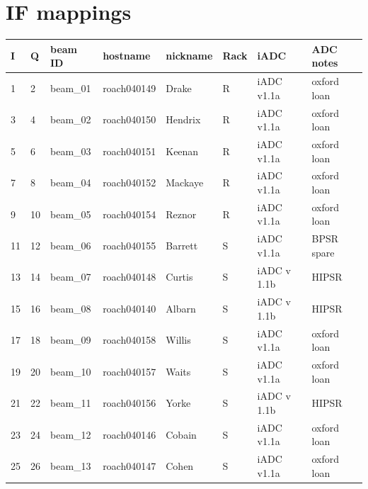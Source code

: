 \documentclass[letterpaper,10pt,english]{sphinxmanual}
\begin{document}
\section{IF mappings}
\label{ip_allocation:if-mappings}
\begin{tabulary}{\linewidth}{|L|L|L|L|L|L|L|L|}
\hline
\textbf{
I
} & \textbf{
Q
} & \textbf{
beam ID
} & \textbf{
hostname
} & \textbf{
nickname
} & \textbf{
Rack
} & \textbf{
iADC
} & \textbf{
ADC notes
}\\\hline

1
 & 
2
 & 
beam\_01
 & 
roach040149
 & 
Drake
 & 
R
 & 
iADC v1.1a
 & 
oxford loan
\\\hline

3
 & 
4
 & 
beam\_02
 & 
roach040150
 & 
Hendrix
 & 
R
 & 
iADC v1.1a
 & 
oxford loan
\\\hline

5
 & 
6
 & 
beam\_03
 & 
roach040151
 & 
Keenan
 & 
R
 & 
iADC v1.1a
 & 
oxford loan
\\\hline

7
 & 
8
 & 
beam\_04
 & 
roach040152
 & 
Mackaye
 & 
R
 & 
iADC v1.1a
 & 
oxford loan
\\\hline

9
 & 
10
 & 
beam\_05
 & 
roach040154
 & 
Reznor
 & 
R
 & 
iADC v1.1a
 & 
oxford loan
\\\hline

11
 & 
12
 & 
beam\_06
 & 
roach040155
 & 
Barrett
 & 
S
 & 
iADC v1.1a
 & 
BPSR spare
\\\hline

13
 & 
14
 & 
beam\_07
 & 
roach040148
 & 
Curtis
 & 
S
 & 
iADC v 1.1b
 & 
HIPSR
\\\hline

15
 & 
16
 & 
beam\_08
 & 
roach040140
 & 
Albarn
 & 
S
 & 
iADC v 1.1b
 & 
HIPSR
\\\hline

17
 & 
18
 & 
beam\_09
 & 
roach040158
 & 
Willis
 & 
S
 & 
iADC v1.1a
 & 
oxford loan
\\\hline

19
 & 
20
 & 
beam\_10
 & 
roach040157
 & 
Waits
 & 
S
 & 
iADC v1.1a
 & 
oxford loan
\\\hline

21
 & 
22
 & 
beam\_11
 & 
roach040156
 & 
Yorke
 & 
S
 & 
iADC v 1.1b
 & 
HIPSR
\\\hline

23
 & 
24
 & 
beam\_12
 & 
roach040146
 & 
Cobain
 & 
S
 & 
iADC v1.1a
 & 
oxford loan
\\\hline

25
 & 
26
 & 
beam\_13
 & 
roach040147
 & 
Cohen
 & 
S
 & 
iADC v1.1a
 & 
oxford loan
\\\hline
\end{tabulary}
\end{document}
